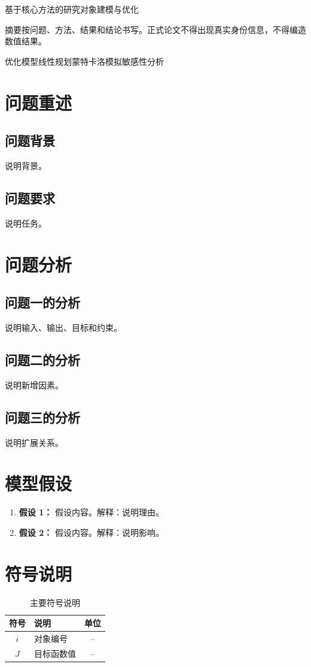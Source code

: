\documentclass[UTF8,a4paper,zihao=-4]{ctexart}
\begin{document}
\setcounter{page}{1}
\begin{center}{\heiti{} 基于核心方法的研究对象建模与优化\par}\end{center}
摘要按问题、方法、结果和结论书写。正式论文不得出现真实身份信息，不得编造数值结果。
\par\vspace{1em}优化模型\quad 线性规划\quad 蒙特卡洛模拟\quad 敏感性分析
\newpage
\section{问题重述}\subsection{问题背景}说明背景。\subsection{问题要求}说明任务。
\section{问题分析}\subsection{问题一的分析}说明输入、输出、目标和约束。\subsection{问题二的分析}说明新增因素。\subsection{问题三的分析}说明扩展关系。
\section{模型假设}\begin{enumerate}\item \textbf{假设 1：} 假设内容。解释：说明理由。\item \textbf{假设 2：} 假设内容。解释：说明影响。\end{enumerate}
\section{符号说明}\begin{table}[!htbp]\centering\caption{主要符号说明}\begin{tabularx}{\textwidth}{cXc}\toprule 符号&说明&单位\\\midrule $i$&对象编号&--\\$J$&目标函数值&--\\\bottomrule\end{tabularx}\end{table}
\end{document}
